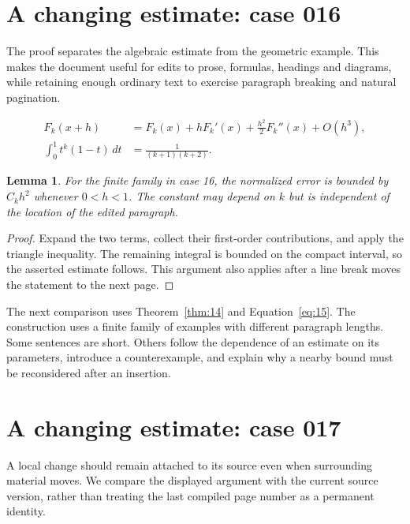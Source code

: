 \documentclass[a4paper,10pt]{article}
\newtheorem{lemma}[theorem]{Lemma}
\begin{document}
\lipsum[23]

\section{A changing estimate: case 016}\label{unit:15}
The proof separates the algebraic estimate from the geometric example. This makes the document useful for edits to prose, formulas, headings and diagrams, while retaining enough ordinary text to exercise paragraph breaking and natural pagination.

\lipsum[16-17]
\begin{align}\label{eq:15}
 F_k(x+h)&=F_k(x)+hF_k'(x)+\frac{h^2}{2}F_k''(x)+O(h^3),\\
 \int_0^1 t^k(1-t)\,dt&=\frac{1}{(k+1)(k+2)}.
\end{align}
\begin{lemma}\label{thm:15}
For the finite family in case 16, the normalized error is bounded by $C_k h^2$ whenever $0<h<1$. The constant may depend on $k$ but is independent of the location of the edited paragraph.
\end{lemma}
\begin{proof}
Expand the two terms, collect their first-order contributions, and apply the
triangle inequality. The remaining integral is bounded on the compact interval,
so the asserted estimate follows. This argument also applies after a line break
moves the statement to the next page.
\end{proof}
\begin{center}
\end{center}
The next comparison uses Theorem~\ref{thm:14} and Equation~\ref{eq:15}. The construction uses a finite family of examples with different paragraph lengths. Some sentences are short. Others follow the dependence of an estimate on its parameters, introduce a counterexample, and explain why a nearby bound must be reconsidered after an insertion.

\lipsum[3]

\section{A changing estimate: case 017}\label{unit:16}
A local change should remain attached to its source even when surrounding material moves. We compare the displayed argument with the current source version, rather than treating the last compiled page number as a permanent identity.
\end{document}
